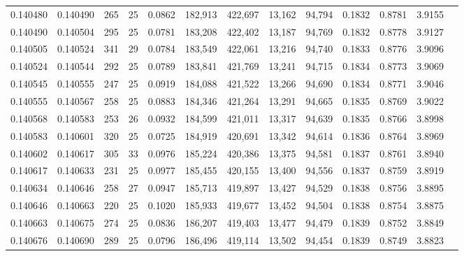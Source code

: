 \begin{tabular}{rrrrrrrrrrrrr}
0.140480 & 0.140490 & 265 &  25 &                                     0.0862 & 182,913 & 422,697 &  13,162 &  94,794 & 0.1832 & 0.8781 & 3.9155 \\
0.140490 & 0.140504 & 295 &  25 &                                     0.0781 & 183,208 & 422,402 &  13,187 &  94,769 & 0.1832 & 0.8778 & 3.9127 \\
0.140505 & 0.140524 & 341 &  29 &                                     0.0784 & 183,549 & 422,061 &  13,216 &  94,740 & 0.1833 & 0.8776 & 3.9096 \\
0.140524 & 0.140544 & 292 &  25 &                                     0.0789 & 183,841 & 421,769 &  13,241 &  94,715 & 0.1834 & 0.8773 & 3.9069 \\
0.140545 & 0.140555 & 247 &  25 &                                     0.0919 & 184,088 & 421,522 &  13,266 &  94,690 & 0.1834 & 0.8771 & 3.9046 \\
0.140555 & 0.140567 & 258 &  25 &                                     0.0883 & 184,346 & 421,264 &  13,291 &  94,665 & 0.1835 & 0.8769 & 3.9022 \\
0.140568 & 0.140583 & 253 &  26 &                                     0.0932 & 184,599 & 421,011 &  13,317 &  94,639 & 0.1835 & 0.8766 & 3.8998 \\
0.140583 & 0.140601 & 320 &  25 &                                     0.0725 & 184,919 & 420,691 &  13,342 &  94,614 & 0.1836 & 0.8764 & 3.8969 \\
0.140602 & 0.140617 & 305 &  33 &                                     0.0976 & 185,224 & 420,386 &  13,375 &  94,581 & 0.1837 & 0.8761 & 3.8940 \\
0.140617 & 0.140633 & 231 &  25 &                                     0.0977 & 185,455 & 420,155 &  13,400 &  94,556 & 0.1837 & 0.8759 & 3.8919 \\
0.140634 & 0.140646 & 258 &  27 &                                     0.0947 & 185,713 & 419,897 &  13,427 &  94,529 & 0.1838 & 0.8756 & 3.8895 \\
0.140646 & 0.140663 & 220 &  25 &                                     0.1020 & 185,933 & 419,677 &  13,452 &  94,504 & 0.1838 & 0.8754 & 3.8875 \\
0.140663 & 0.140675 & 274 &  25 &                                     0.0836 & 186,207 & 419,403 &  13,477 &  94,479 & 0.1839 & 0.8752 & 3.8849 \\
0.140676 & 0.140690 & 289 &  25 &                                     0.0796 & 186,496 & 419,114 &  13,502 &  94,454 & 0.1839 & 0.8749 & 3.8823 \\

\end{tabular}
